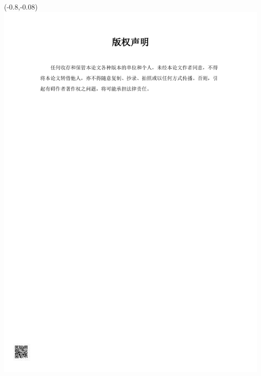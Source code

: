 \begin{textblock}{1}(-0.8,-0.08)
    \colorbox{white}{
        \includegraphics[height = 1.2448\textheight]{copyright/bqsm_1801110211.pdf}
    }
\end{textblock}

